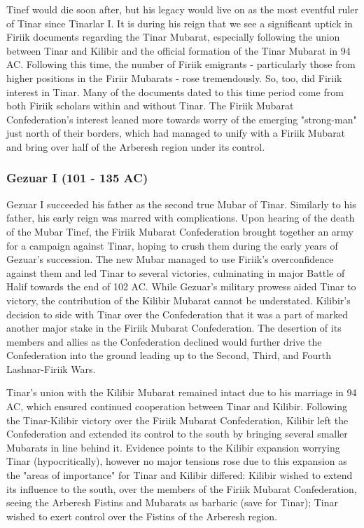 			Tinef would die soon after, but his legacy would live on as the most eventful ruler of Tinar since Tinarlar I. It is during his reign that we see a significant uptick in Firiik documents regarding the Tinar Mubarat, especially following the union between Tinar and Kilibir and the official formation of the Tinar Mubarat in 94 AC. Following this time, the number of Firiik emigrants - particularly those from higher positions in the Firiir Mubarats - rose tremendously. So, too, did Firiik interest in Tinar. Many of the documents dated to this time period come from both Firiik scholars within and without Tinar. The Firiik Mubarat Confederation's interest leaned more towards worry of the emerging "strong-man" just north of their borders, which had managed to unify with a Firiik Mubarat and bring over half of the Arberesh region under its control. 
		\subsubsection{Gezuar I (101 - 135 AC)}
			Gezuar I succeeded his father as the second true Mubar of Tinar. Similarly to his father, his early reign was marred with complications. Upon hearing of the death of the Mubar Tinef, the Firiik Mubarat Confederation brought together an army for a campaign against Tinar, hoping to crush them during the early years of Gezuar's succession. The new Mubar managed to use Firiik's overconfidence against them and led Tinar to several victories, culminating in major Battle of Halif towards the end of 102 AC. While Gezuar's military prowess aided Tinar to victory, the contribution of the Kilibir Mubarat cannot be understated. Kilibir's decision to side with Tinar over the Confederation that it was a part of marked another major stake in the Firiik Mubarat Confederation. The desertion of its members and allies as the Confederation declined would further drive the Confederation into the ground leading up to the Second, Third, and Fourth Lashnar-Firiik Wars.
			
			Tinar's union with the Kilibir Mubarat remained intact due to his marriage in 94 AC, which ensured continued cooperation between Tinar and Kilibir. Following the Tinar-Kilibir victory over the Firiik Mubarat Confederation, Kilibir left the Confederation and extended its control to the south by bringing several smaller Mubarats in line behind it. Evidence points to the Kilibir expansion worrying Tinar (hypocritically), however no major tensions rose due to this expansion as the "areas of importance" for Tinar and Kilibir differed: Kilibir wished to extend its influence to the south, over the members of the Firiik Mubarat Confederation, seeing the Arberesh Fistins and Mubarats as barbaric (save for Tinar); Tinar wished to exert control over the Fistins of the Arberesh region. 
			
